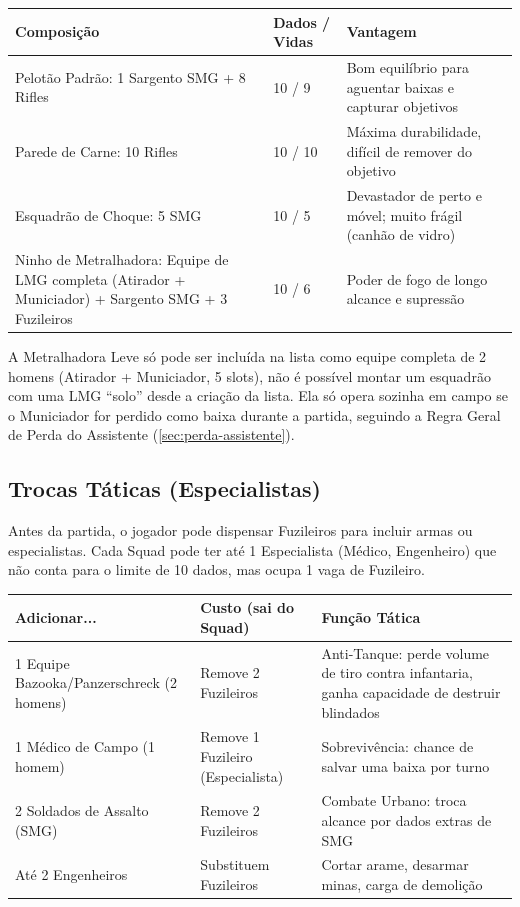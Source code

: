 \begin{center}
\begin{tabular}{p{4.4cm}p{2.6cm}p{5.4cm}}
\toprule
Composição & Dados / Vidas & Vantagem \\
\midrule
Pelotão Padrão: 1 Sargento SMG + 8 Rifles & 10 / 9 & Bom equilíbrio para aguentar baixas e capturar objetivos \\
Parede de Carne: 10 Rifles & 10 / 10 & Máxima durabilidade, difícil de remover do objetivo \\
Esquadrão de Choque: 5 SMG & 10 / 5 & Devastador de perto e móvel; muito frágil (canhão de vidro) \\
Ninho de Metralhadora: Equipe de LMG completa (Atirador + Municiador) + Sargento SMG + 3 Fuzileiros & 10 / 6 & Poder de fogo de longo alcance e supressão \\
\bottomrule
\end{tabular}
\end{center}

\begin{nota}
A Metralhadora Leve só pode ser incluída na lista como equipe completa de 2 homens (Atirador + Municiador, 5 slots), não é possível montar um esquadrão com uma LMG ``solo'' desde a criação da lista. Ela só opera sozinha em campo se o Municiador for perdido como baixa durante a partida, seguindo a Regra Geral de Perda do Assistente (\ref{sec:perda-assistente}).
\end{nota}

\subsection{Trocas Táticas (Especialistas)}

Antes da partida, o jogador pode dispensar Fuzileiros para incluir armas ou especialistas. Cada Squad pode ter até 1 Especialista (Médico, Engenheiro) que não conta para o limite de 10 dados, mas ocupa 1 vaga de Fuzileiro.

\begin{center}
\begin{tabular}{p{4.2cm}p{3.4cm}p{4.8cm}}
\toprule
Adicionar... & Custo (sai do Squad) & Função Tática \\
\midrule
1 Equipe Bazooka/Panzerschreck (2 homens) & Remove 2 Fuzileiros & Anti-Tanque: perde volume de tiro contra infantaria, ganha capacidade de destruir blindados \\
1 Médico de Campo (1 homem) & Remove 1 Fuzileiro (Especialista) & Sobrevivência: chance de salvar uma baixa por turno \\
2 Soldados de Assalto (SMG) & Remove 2 Fuzileiros & Combate Urbano: troca alcance por dados extras de SMG \\
Até 2 Engenheiros & Substituem Fuzileiros & Cortar arame, desarmar minas, carga de demolição \\
\bottomrule
\end{tabular}
\end{center}

